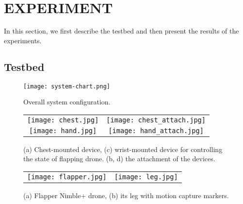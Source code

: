 \section{EXPERIMENT}
In this section, we first describe the testbed and then present the results of the experiments.

\subsection{Testbed}

\begin{figure}
  \centering
  \texttt{[image: system-chart.png]}
  \caption{Overall system configuration.}
  \label{fig:system}
\end{figure}

\begin{figure}
  \centering
  \begin{tabular}{cc}
      \begin{minipage}[t]{0.4 \columnwidth}
        \centering
        \texttt{[image: chest.jpg]}
        \subcaption{}
        \label{fig:chest}
      \end{minipage} &
      \begin{minipage}[t]{0.4 \columnwidth}
        \centering
        \texttt{[image: chest\_attach.jpg]}
        \subcaption{}
        \label{fig:chest_attach}
      \end{minipage} \\
      \begin{minipage}[t]{0.4 \columnwidth}
        \centering
        \texttt{[image: hand.jpg]}
        \subcaption{}
        \label{fig:hand}
      \end{minipage} &
      \begin{minipage}[t]{0.4 \columnwidth}
        \centering
        \texttt{[image: hand\_attach.jpg]}
        \subcaption{}
        \label{fig:hand_attach}
      \end{minipage}
    \end{tabular}
  \caption{(a) Chest-mounted device, (c) wrist-mounted device for controlling the state of flapping drone. (b, d) the attachment of the devices.}
\end{figure}
\begin{figure}
  \centering
  \begin{tabular}{cc}
      \begin{minipage}[t]{0.4 \columnwidth}
        \centering
        \texttt{[image: flapper.jpg]}
        \subcaption{}
        \label{fig:flapper}
      \end{minipage} &
      \begin{minipage}[t]{0.4 \columnwidth}
        \centering
        \texttt{[image: leg.jpg]}
        \subcaption{}
        \label{fig:leg}
      \end{minipage}
    \end{tabular}
  \caption{(a) Flapper Nimble+ drone, (b) its leg with motion capture markers.}
\end{figure}
